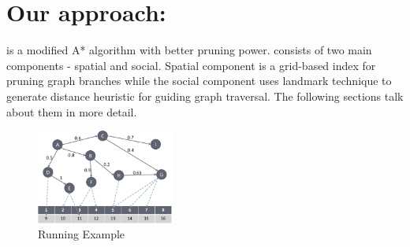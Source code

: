 \section{Our approach: {\orirrp}} \label{sec:solution}
{\rrp} is a modified A* algorithm with better pruning power. {\rrp} consists of two main components - spatial and social. Spatial component is a grid-based index for pruning graph branches while the social component uses landmark technique to generate distance heuristic for guiding graph traversal. The following sections talk about them in more detail.


\begin{figure}[t]
	\centering \includegraphics[width=0.40\textwidth]{images/space_partitioned_world.eps}
    \caption{Running Example}
    \label{fig:running-example-solution}
\end{figure}


